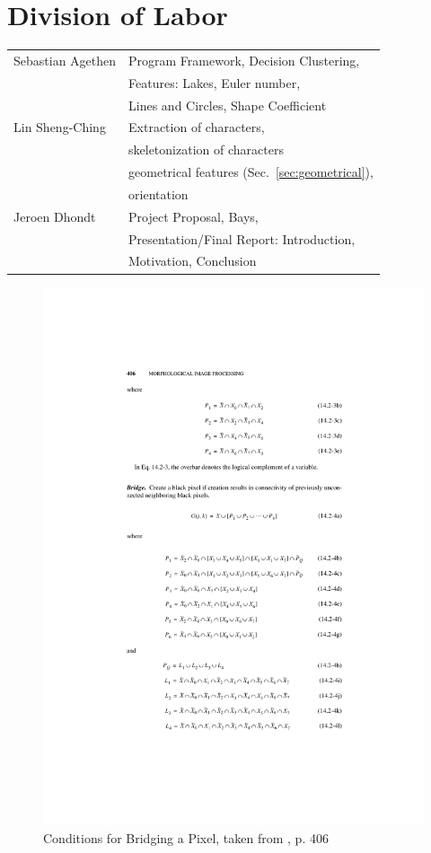 \documentclass{article}
\begin{document}
\section{Division of Labor}

\begin{tabular}{|l|l|}
 \hline
 Sebastian Agethen & Program Framework, Decision Clustering, \\
  & Features: Lakes, Euler number, \\
 & Lines and Circles, Shape Coefficient\\
\hline
 Lin Sheng-Ching & Extraction of characters, \\
 &  skeletonization of characters\\
  & geometrical features (Sec.~\ref{sec:geometrical}), \\ & orientation \\
\hline
 Jeroen Dhondt & Project Proposal, Bays, \\
 & Presentation/Final Report: Introduction, \\
 & Motivation, Conclusion\\
\hline
\end{tabular}


\begin{figure}
 \includegraphics{images/bridge.pdf}
 \caption{Conditions for Bridging a Pixel, taken from \cite{Pratt:2001:DIP:516234}, p. 406}
 \label{fig:bridge}
\end{figure}
\end{document}
